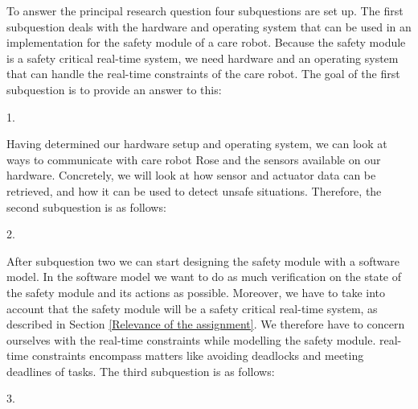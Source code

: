 \documentclass[12pt]{scrreprt}
\begin{document}
\begin{flushleft}
\textit{\mq}
\end{flushleft}

To answer the principal research question four subquestions are set up. The first subquestion deals with the hardware and operating system that can be used in an implementation for the safety module of a care robot. Because the safety module is a safety critical real-time system, we need hardware and an operating system that can handle the real-time constraints of the care robot. The goal of the first subquestion is to provide an answer to this:

\begin{flushleft}
1. \textit{\sqone}
\end{flushleft}

%

Having determined our hardware setup and operating system, we can look at ways to communicate with care robot Rose and the sensors available on our hardware. Concretely, we will look at how sensor and actuator data can be retrieved, and how it can be used to detect unsafe situations. Therefore, the second subquestion is as follows:

\begin{flushleft}
2. \textit{\sqtwo}
\end{flushleft}

After subquestion two we can start designing the safety module with a software model. In the software model we want to do as much verification on the state of the safety module and its actions as possible. Moreover, we have to take into account that the safety module will be a safety critical real-time system, as described in Section \ref{Relevance of the assignment}.
We therefore have to concern ourselves with the real-time constraints while modelling the safety module. real-time constraints encompass matters like avoiding deadlocks and meeting deadlines of tasks. The third subquestion is as follows:

\begin{flushleft}
3. \textit{\sqthree}
\end{flushleft}
\end{document}
